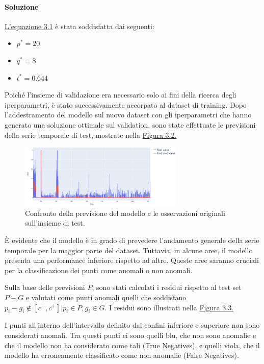     \paragraph{Soluzione} \hyperref[eq:arma-problem]{L'equazione 3.1}  è stata soddisfatta dai seguenti:
    \begin{itemize}
        \item $p^* = 20$
        \item $q^* = 8$
        \item $t^* = 0.644$
    \end{itemize}

    Poiché l'insieme di validazione era necessario solo ai fini della ricerca degli iperparametri, è 
    stato successivamente accorpato al dataset di training. Dopo l'addestramento del modello sul nuovo dataset 
    con gli iperparametri che hanno generato una soluzione ottimale sul validation, sono state effettuate 
    le previsioni della serie temporale di test, mostrate nella \hyperref[fig:arma-sol]{Figura 3.2.}


    \begin{figure}[h]
        \centering
        \includegraphics[width=0.7\textwidth]{./input/chapters/models/figs/arma-sol.png}
        \caption{Confronto della previsione del modello e le osservazioni originali sull'insieme di test.}
        \label{fig:arma-sol}
    \end{figure}

    È evidente che il modello è in grado di prevedere l'andamento generale della serie temporale per la maggior
    parte del dataset. Tuttavia, in alcune aree, il modello presenta una performance inferiore rispetto ad altre.
    Queste aree saranno cruciali per la classificazione dei punti come anomali o non anomali.

    Sulla base delle previsioni $P$, sono stati calcolati i residui rispetto al test set $P-G$ e valutati come punti 
    anomali quelli che soddisfano $p_i-g_i \notin [c^-, c^+] | p_i \in P, g_i \in G$. I residui sono illustrati nella \hyperref[fig:residuals]{Figura 3.3.}

    I punti all'interno dell'intervallo definito dai confini inferiore e superiore non sono considerati anomali. 
    Tra questi punti ci sono quelli blu, che non sono anomalie e che il modello non ha considerato come tali
    (True Negatives), e quelli viola, che il modello ha erroneamente classificato come non anomalie (False Negatives).

